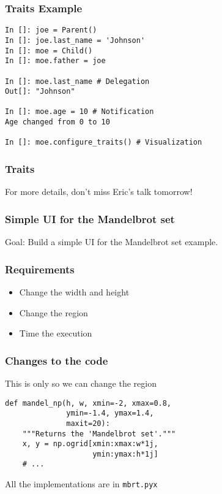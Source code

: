 \documentclass[14pt,compress]{beamer}
\newcommand{\typ}[1]{\lstinline{#1}}
\begin{document}
\begin{frame}
  \frametitle{Traits Example}
\vspace*{-6pt}
\small
\begin{lstlisting}
In []: joe = Parent()
In []: joe.last_name = 'Johnson'
In []: moe = Child()
In []: moe.father = joe

In []: moe.last_name # Delegation
Out[]: "Johnson"

In []: moe.age = 10 # Notification
Age changed from 0 to 10

In []: moe.configure_traits() # Visualization
\end{lstlisting}
\end{frame}

\begin{frame}
  \frametitle{Traits}

  \begin{center}
  \alert{For more details, don't miss Eric's talk tomorrow!}
  \end{center}

\end{frame}

\begin{frame}
  \frametitle{Simple UI for the Mandelbrot set}
\begin{center}
    Goal: Build a simple UI for the Mandelbrot set example.
\end{center}
\end{frame}

\begin{frame}
    \frametitle{Requirements}

    \begin{itemize}
        \item Change the width and height
        \item Change the region
        \item Time the execution
    \end{itemize}
\end{frame}

\begin{frame}[fragile]
  \frametitle{Changes to the code}
  \alert{This is only so we can change the region}
  \begin{lstlisting}
def mandel_np(h, w, xmin=-2, xmax=0.8, 
              ymin=-1.4, ymax=1.4, 
              maxit=20):
    """Returns the 'Mandelbrot set'."""
    x, y = np.ogrid[xmin:xmax:w*1j, 
                    ymin:ymax:h*1j]
    # ... 
  \end{lstlisting}

All the implementations are in \typ{mbrt.pyx}
\end{frame}
\end{document}
